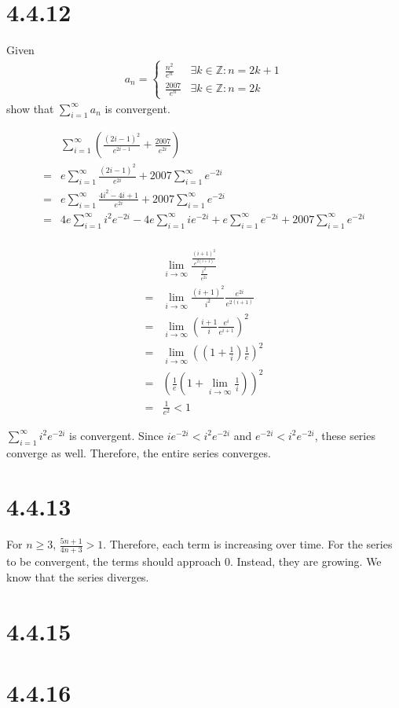\documentclass[12pt]{article}
\newcommand{\round}[1]{\left(       #1 \right)      }
\newcommand{\Z}    [0]{\mathbb{Z}                   }
\begin{document}
\section*{4.4.12}
Given
\begin{align*}
    a_n = \begin{cases}
        \frac{n^2}{e^n} & \exists k \in \Z : n = 2k+1 \\
        \frac{2007}{e^n} & \exists k \in \Z : n = 2k
    \end{cases}
\end{align*}
show that $\sum_{i=1}^\infty a_n$ is convergent.

\begin{align*}
     & \sum_{i=1}^\infty \round{\frac{(2i-1)^2}{e^{2i-1}} + \frac{2007}{e^{2i}}} \\
    =& e \sum_{i=1}^\infty \frac{(2i-1)^2}{e^{2i}} + 2007 \sum_{i=1}^\infty e^{-2i} \\
    =& e \sum_{i=1}^\infty \frac{4i^2 - 4i + 1}{e^{2i}} + 2007 \sum_{i=1}^\infty e^{-2i} \\
    =& 4e \sum_{i=1}^\infty i^2 e^{-2i} - 4e \sum_{i=1}^\infty ie^{-2i} + e \sum_{i=1}^\infty e^{-2i} + 2007 \sum_{i=1}^\infty e^{-2i} \\
\end{align*}

\begin{align*}
     & \lim_{i\to\infty} \frac{\frac{(i+1)^2}{e^{2(i+1)}}} {\frac{i^2}{e^{2i}}} \\
    =& \lim_{i\to\infty} \frac{(i+1)^2}{i^2} \frac{e^{2i}}{e^{2(i+1)}} \\
    =& \lim_{i\to\infty} \round{\frac{i+1}{i} \frac{e^{i}}{e^{i+1}}}^2 \\
    =& \lim_{i\to\infty} \round{\round{1+\frac{1}{i}} \frac{1}{e}}^2 \\
    =& \round{ \frac{1}{e} \round{1 + \lim_{i\to\infty} \frac{1}{i}} }^2 \\
    =& \frac{1}{e^2} < 1
\end{align*}

$\sum_{i=1}^\infty i^2 e^{-2i}$ is convergent. Since $i e^{-2i} < i^2 e^{-2i}$ and $e^{-2i} < i^2 e^{-2i}$, these series converge as well. Therefore, the entire series converges.



\section*{4.4.13}
For $n \geq 3$, $\frac{5n+1}{4n+3} > 1$. Therefore, each term is increasing over time. For the series to be convergent, the terms should approach 0. Instead, they are growing. We know that the series diverges.



\section*{4.4.15}



\section*{4.4.16}
\end{document}
